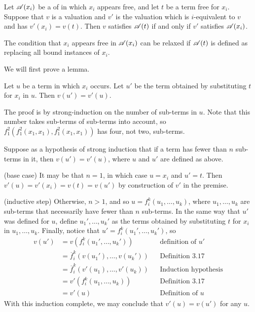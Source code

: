 \setcounter{definition}{22}
\begin{proposition}
  Let \(\mathscr{A}(x_i)\) be a \wf{} of \cl{} in which \(x_i\) appears free, and let \(t\) be a term free for \(x_i\). Suppose that \(v\) is a valuation and \(v'\) is the valuation which is \(i\)-equivalent to \(v\) and has \(v'(x_i) = v(t)\). Then \(v\) satisfies \(\mathscr{A}(t)\) if and only if \(v'\) satisfies \(\mathscr{A}(x_i)\).

  \note{} The condition that \(x_i\) appears free in \(\mathscr{A}(x_i)\) can be relaxed if \(\mathscr{A}(t)\) is defined as replacing all bound instances of \(x_i\).

  \prf{} We will first prove a lemma.

  \begin{lemma*}
    Let \(u\) be a term in which \(x_i\) occurs. Let \(u'\) be the term obtained by substituting \(t\) for \(x_i\) in \(u\). Then \(v(u') = v'(u)\).

    \prf{} The proof is by strong-induction on the number of sub-terms in \(u\). Note that this number takes sub-terms of sub-terms into account, so \(f^2_1(f^2_1(x_1, x_1), f^2_1(x_1, x_1))\) has four, not two, sub-terms.

    Suppose as a hypothesis of strong induction that if a term has fewer than \(n\) sub-terms in it, then \(v(u') = v'(u)\), where \(u\) and \(u'\) are defined as above.

    (base case) It may be that \(n = 1\), in which case \(u = x_i\) and \(u' = t\). Then \(v'(u) = v'(x_i) = v(t) = v(u')\) by construction of \(v'\) in the premise.

    (inductive step) Otherwise, \(n > 1\), and so \(u = f^k_i(u_1, \dots, u_k)\), where \(u_1, \dots, u_k\) are sub-terms that necessarily have fewer than \(n\) sub-terms. In the same way that \(u'\) was defined for \(u\), define \(u_1', \dots, u_k'\) as the terms obtained by substituting \(t\) for \(x_i\) in \(u_1, \dots, u_k\). Finally, notice that \(u'=f^k_i(u_1', \dots, u_k')\), so
    \begin{align*}
      v(u') &= v(f^k_i(u_1', \dots, u_k'))                      &&\text{definition of \(u'\)}\\
            &= \overline{f}^k_i(v(u_1'), \dots, v(u_k'))        &&\text{Definition 3.17}\\
            &= \overline{f}^k_i(v'(u_1), \dots, v'(u_k))        &&\text{Induction hypothesis}\\
            &= v'(f^k_i(u_1, \dots, u_k))                       &&\text{Definition 3.17}\\
            &= v'(u)                                            &&\text{Definition of \(u\)}
    \end{align*}
  With this induction complete, we may conclude that \(v'(u) = v(u')\) for any \(u\).
  \end{lemma*}


\end{proposition}
